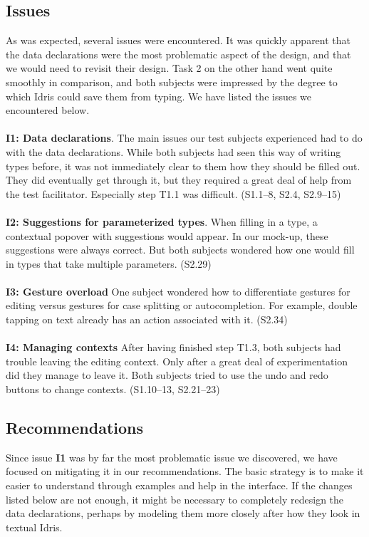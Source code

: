 \subsection{Issues}
\label{sec:first_issues}
As was expected, several issues were encountered. It was quickly apparent that
the data declarations were the most problematic aspect of the design, and that
we would need to revisit their design. Task 2 on the other hand went quite
smoothly in comparison, and both subjects were impressed by the degree to
which Idris could save them from typing. We have listed the issues we
encountered below. \\ \\
\textbf{I1: Data declarations}.
The main issues our test subjects experienced had to do with the data
declarations. While both subjects had seen this way of writing types
before, it was not immediately clear to them how they should be filled out.
They did eventually get through it, but they required a great deal of help
from the test facilitator. Especially step T1.1 was difficult. (S1.1--8, S2.4, S2.9--15)\\ \\
\textbf{I2: Suggestions for parameterized types}.
When filling in a type, a contextual popover with suggestions would appear. In our mock-up,
these suggestions were always correct. But both subjects wondered how one would
fill in types that take multiple parameters. (S2.29) \\ \\
\textbf{I3: Gesture overload}
One subject wondered how to differentiate gestures for editing versus
gestures for case splitting or autocompletion. For example, double tapping on
text already has an action associated with it. (S2.34) \\ \\
\textbf{I4: Managing contexts}
After having finished step T1.3, both subjects had trouble leaving the editing
context. Only after a great deal of experimentation did they manage to leave
it. Both subjects tried to use the undo and redo buttons to change contexts.
(S1.10--13, S2.21--23)

\subsection{Recommendations}
\label{sec:first_recommendations}
Since issue \textbf{I1} was by far the most problematic issue we discovered, we have
focused on mitigating it in our recommendations. The basic strategy is to make
it easier to understand through examples and help in the interface. If the
changes listed below are not enough, it might be necessary to completely
redesign the data declarations, perhaps by modeling them more closely after how
they look in textual Idris.

